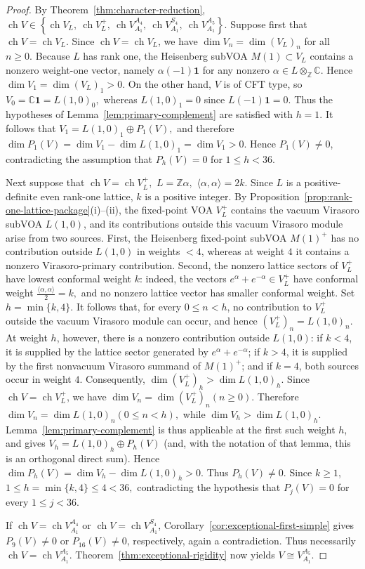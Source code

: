 \documentclass[12pt,leqno]{amsart}
\numberwithin{equation}{section} \newtheorem{thm}{Theorem}[section] \newtheorem{lem}[thm]{Lemma} \newtheorem{ex}[thm]{Example} \newtheorem{prop}[thm]{Proposition} \newtheorem{cor}[thm]{Corollary} \newtheorem{defi}[thm]{Definition} \newtheorem{rmk}[thm]{Remark} \newtheorem{notation}[thm]{Notation}
\newcommand{\ch}{\operatorname{ch}}
\begin{document}
\begin{proof}
By Theorem~\ref{thm:character-reduction}, \(\ch V\in \left\{ \ch V_L,\ \ch V_L^+,\ \ch V_{A_1}^{A_4},\ \ch V_{A_1}^{S_4},\ \ch V_{A_1}^{A_5} \right\}\). Suppose first that \(\ch V=\ch V_L\). Since \(\ch V=\ch V_L\), we have $ \dim V_n=\dim (V_L)_n $ for all $n\ge0. $ Because \(L\) has rank one, the Heisenberg subVOA \(M(1)\subset V_L\) contains a nonzero weight-one vector, namely \(\alpha(-1)\mathbf 1\) for any nonzero \(\alpha\in L\otimes_{\mathbb Z}\mathbb C\). Hence $ \dim V_1=\dim (V_L)_1>0. $ On the other hand, \(V\) is of CFT type, so $ V_0=\mathbb C\mathbf1=L(1,0)_0, $ whereas $ L(1,0)_1=0 $ since \(L(-1)\mathbf1=0\). Thus the hypotheses of Lemma~\ref{lem:primary-complement} are satisfied with \(h=1\). It follows that $ V_1=L(1,0)_1\oplus P_1(V), $ and therefore $ \dim P_1(V) =\dim V_1-\dim L(1,0)_1 =\dim V_1>0. $ Hence \(P_1(V)\ne0\), contradicting the assumption that \(P_h(V)=0\) for \(1\le h<36\).

Next suppose that $ \ch V=\ch V_L^+,$ $L=\mathbb Z\alpha, $ $\langle\alpha,\alpha\rangle=2k. $ Since \(L\) is a positive-definite even rank-one lattice, \(k\) is a positive integer. By Proposition~\ref{prop:rank-one-lattice-package}(i)--(ii), the fixed-point VOA \(V_L^+\) contains the vacuum Virasoro subVOA \(L(1,0)\), and its contributions outside this vacuum Virasoro module arise from two sources. First, the Heisenberg fixed-point subVOA \(M(1)^+\) has no contribution outside \(L(1,0)\) in weights \(<4\), whereas at weight \(4\) it contains a nonzero Virasoro-primary contribution. Second, the nonzero lattice sectors of \(V_L^+\) have lowest conformal weight \(k\): indeed, the vectors $ e^\alpha+e^{-\alpha}\in V_L^+ $ have conformal weight $ \frac{\langle\alpha,\alpha\rangle}{2}=k, $ and no nonzero lattice vector has smaller conformal weight. Set $ h=\min\{k,4\}. $ It follows that, for every \(0\le n<h\), no contribution to \(V_L^+\) outside the vacuum Virasoro module can occur, and hence $ (V_L^+)_n=L(1,0)_n. $ At weight \(h\), however, there is a nonzero contribution outside \(L(1,0)\): if \(k<4\), it is supplied by the lattice sector generated by \(e^\alpha+e^{-\alpha}\); if \(k>4\), it is supplied by the first nonvacuum Virasoro summand of \(M(1)^+\); and if \(k=4\), both sources occur in weight \(4\). Consequently, $ \dim (V_L^+)_h>\dim L(1,0)_h. $ Since \(\ch V=\ch V_L^+\), we have $ \dim V_n=\dim (V_L^+)_n (n\ge0). $ Therefore $ \dim V_n=\dim L(1,0)_n (0\le n<h), $ while $ \dim V_h>\dim L(1,0)_h. $ Lemma~\ref{lem:primary-complement} is thus applicable at the first such weight \(h\), and gives $ V_h=L(1,0)_h\oplus P_h(V) $ (and, with the notation of that lemma, this is an orthogonal direct sum). Hence $ \dim P_h(V) = \dim V_h-\dim L(1,0)_h >0. $ Thus \(P_h(V)\ne0\). Since \(k\ge1\), $ 1\le h=\min\{k,4\}\le4<36, $ contradicting the hypothesis that \(P_j(V)=0\) for every \(1\le j<36\).

If \(\ch V=\ch V_{A_1}^{A_4}\) or \(\ch V=\ch V_{A_1}^{S_4}\), Corollary~\ref{cor:exceptional-first-simple} gives \(P_9(V)\ne0\) or \(P_{16}(V)\ne0\), respectively, again a contradiction. Thus necessarily \(\ch V=\ch V_{A_1}^{A_5}.\) Theorem~\ref{thm:exceptional-rigidity} now yields \(V\cong V_{A_1}^{A_5}\).
\end{proof}
\end{document}
